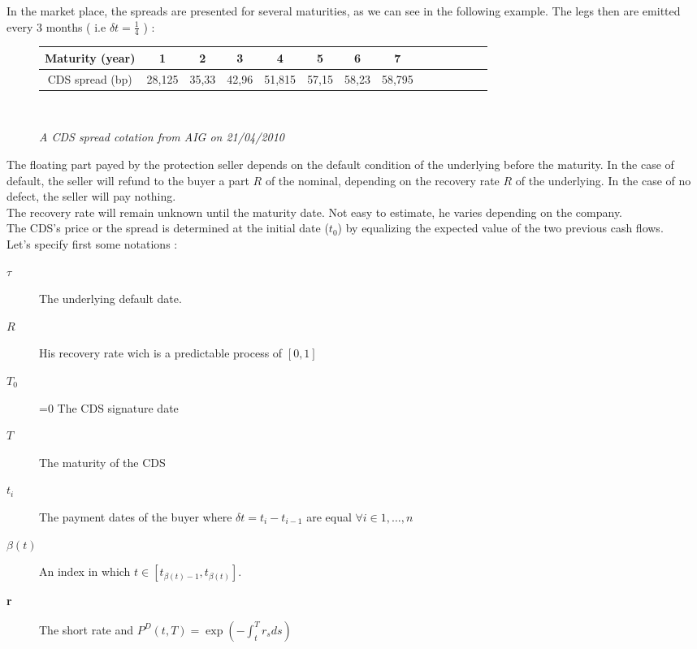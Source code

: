 \begin{example}  In the  market place,  the  spreads are  presented for  several
  maturities, as we can see in the  following example. The legs then are emitted
  every 3 months ( i.e $\delta t = \frac{1}{4}$ ) :

    \begin{figure}[H]
      \centering
       \begin{tabular}[H]{|c|c|c|c|c|c|c|c|c|c|c|c|c|c|}
      \hline
      Maturity (year) & 1 & 2 & 3 & 4 & 5 & 6 & 7 \\
      \hline
      CDS spread (bp) & 28,125 & 35,33 & 42,96 & 51,815 & 57,15 & 58,23 & 58,795 \\ 
      \hline
    \end{tabular}
\\
    \caption{\it A CDS spread cotation from AIG on 21/04/2010}
    \end{figure}

\end{example}
The  floating  part payed  by  the  protection  seller  depends on  the  default
condition of  the underlying before the  maturity.  In the case  of default, the
seller will  refund to the  buyer a  part $R$ of  the nominal, depending  on the
recovery rate $R$ of  the underlying. In the case of no  defect, the seller will
pay nothing.\\

The recovery rate will remain unknown until the maturity date. Not easy to estimate,
he varies depending on the company.\\

The CDS's  price or  the spread  is determined  at the  initial date  ($t_0$) by
equalizing the expected value of the two previous cash flows.\\

Let's specify first some notations :
\begin{description}
\item[\textbf{$\tau$}] The underlying default date.
\item[\textbf{$R$}] His recovery rate wich is a predictable process of $[0,1]$
\item[\textbf{$T_0$}] =0 The CDS signature date
\item[\textbf{$T$}] The maturity of the CDS
\item[\textbf{$t_i$}] The  payment dates  of the buyer  where $\delta  t=t_i-t_{i-1}$ are
  equal $\forall i \in 1,\dots,n$
\item[\textbf{$\beta(t)$}] An index in which $t\in[t_{\beta(t)-1},t_{\beta(t)}]$.
\item[\textbf{r}] The short rate and $P^D(t,T)=\exp(-\int_t^Tr_sds)$
\end{description}

